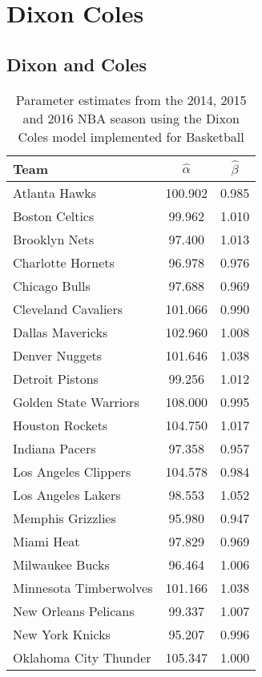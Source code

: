 \chapter{Dixon Coles}


\section{Dixon and Coles}



\begin{table}[t]
	\centering
	\caption{Parameter estimates from the 2014, 2015 and 2016 NBA season using the Dixon Coles model implemented for Basketball}
	\begin{tabular}{|l|c|c|}
		\hline
		\textbf{Team}  & \textbf{$\hat{\alpha}$} & \textbf{$\hat{\beta}$} \\ \hline
		Atlanta Hawks  & 100.902 & 0.985\\ \hline
		Boston Celtics & 99.962 & 1.010\\ \hline
		Brooklyn Nets  & 97.400 & 1.013\\ \hline
		Charlotte Hornets & 96.978 & 0.976\\ \hline
		Chicago Bulls & 97.688 & 0.969\\ \hline
		Cleveland Cavaliers & 101.066 & 0.990\\ \hline
		Dallas Mavericks & 102.960 & 1.008 \\ \hline
		Denver Nuggets & 101.646 & 1.038\\ \hline
		Detroit Pistons & 99.256 & 1.012\\ \hline
		Golden State Warriors & 108.000 & 0.995\\ \hline
		Houston Rockets & 104.750 & 1.017 \\ \hline
		Indiana Pacers & 97.358 & 0.957 \\ \hline
		Los Angeles Clippers & 104.578 & 0.984\\ \hline
		Los Angeles Lakers & 98.553 & 1.052 \\ \hline
		Memphis Grizzlies & 95.980 & 0.947\\ \hline
		Miami Heat & 97.829 & 0.969\\ \hline
		Milwaukee Bucks & 96.464 & 1.006\\ \hline
		Minnesota Timberwolves & 101.166 & 1.038\\ \hline
		New Orleans Pelicans & 99.337 & 1.007\\ \hline
		New York Knicks & 95.207 & 0.996\\ \hline
		Oklahoma City Thunder & 105.347 & 1.000\\ \hline

\end{tabular}
\end{table}
